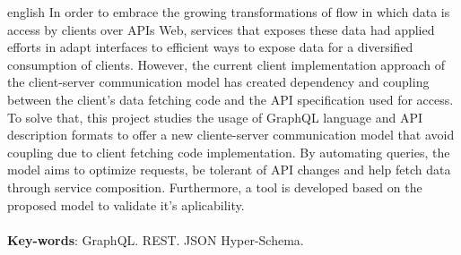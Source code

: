 \begin{resumo}[Abstract]
  \begin{otherlanguage*}{english}
  In order to embrace the growing transformations of flow in which data is access by clients over APIs Web, services that exposes these data had applied efforts in adapt interfaces to  efficient ways to expose data for a diversified consumption of clients. However, the current client implementation approach of the client-server communication model has created dependency and coupling between the client's data fetching code and the API specification used for access. To solve that, this project studies the usage of GraphQL language and API description formats to offer a new cliente-server communication model that avoid coupling due to client fetching code implementation. By automating queries, the model aims to optimize requests, be tolerant of API changes and help fetch data through service composition. Furthermore, a tool is developed based on the proposed model to validate it's aplicability. \\ \\
    \textbf{Key-words}: GraphQL. REST. JSON Hyper-Schema.
  \end{otherlanguage*}
\end{resumo}

